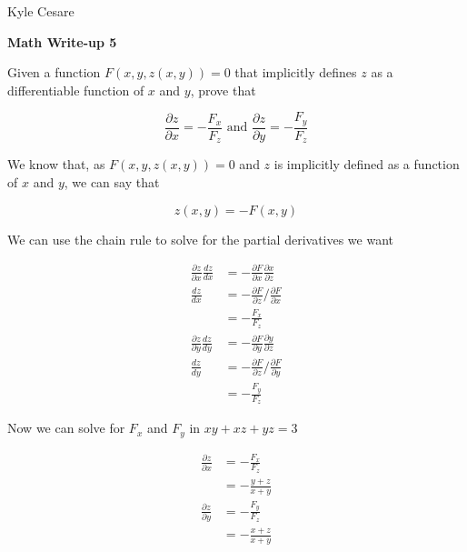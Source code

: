 \documentclass[11pt]{article}
\begin{document}
\begin{flushright}
  Kyle Cesare
\end{flushright}

{\center \textbf{Math Write-up 5} \\}

Given a function $F(x, y, z(x, y)) = 0$ that implicitly defines $z$ as a
differentiable function of $x$ and $y$, prove that

$$
  \frac{ \partial z }{ \partial x } = -\frac{ F_x }{ F_z } \text{ and }
  \frac{ \partial z }{ \partial y } = -\frac{ F_y }{ F_z }
$$

We know that, as $F(x, y, z(x, y)) = 0$ and $z$ is implicitly defined as a
function of $x$ and $y$, we can say that

$$
  z(x, y) = -F(x, y)
$$

We can use the chain rule to solve for the partial derivatives we want

\begin{align*}
  \frac{ \partial z }{ \partial x } \frac{ dz }{ dx }
    &= -\frac{ \partial F }{ \partial x } \frac{ \partial x }{ \partial z } \\
  \frac{ dz }{ dx } 
    &= -\frac{ \partial F }{ \partial z } / \frac{ \partial F }{ \partial x } \\
    &= -\frac{ F_x }{ F_z } \\
  \frac{ \partial z }{ \partial y } \frac{ dz }{ dy }
    &= -\frac{ \partial F }{ \partial y } \frac{ \partial y }{ \partial z } \\
  \frac{ dz }{ dy } 
    &= -\frac{ \partial F }{ \partial z } / \frac{ \partial F }{ \partial y } \\
    &= -\frac{ F_y }{ F_z }
\end{align*}

Now we can solve for $F_x$ and $F_y$ in $xy + xz + yz = 3$

\begin{align*}
  \frac{ \partial z }{ \partial x }
    &= -\frac{ F_x }{ F_z } \\
    &= -\frac{ y + z }{ x + y } \\
  \frac{ \partial z }{ \partial y }
    &= -\frac{ F_y }{ F_z } \\
    &= -\frac{ x + z }{ x + y } \\
\end{align*}
\end{document}
